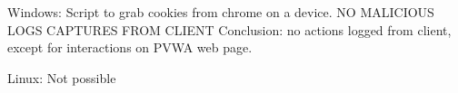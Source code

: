 Windows: Script to grab cookies from chrome on a device.
NO MALICIOUS LOGS CAPTURES FROM CLIENT
Conclusion: no actions logged from client, except for interactions on PVWA web page.


Linux: Not possible